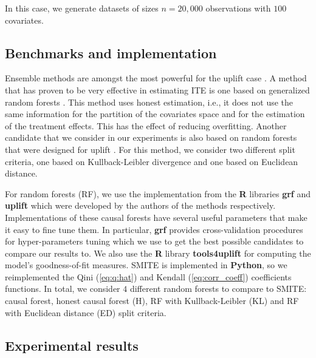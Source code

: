 \documentclass{article}
\begin{document}
In this case, we generate datasets of sizes $n=20,000$ observations with $100$ covariates.



\subsection{Benchmarks and implementation}

Ensemble methods are amongst the most powerful for the uplift case \citep{soltys2015ensemble}. A method that has proven to be very effective in estimating ITE is one based on generalized random forests \citep{athey2019generalized}. This method uses honest estimation, i.e., it does not use the same information for the partition of the covariates space and for the estimation of the treatment effects. This has the effect of reducing overfitting. Another candidate that we consider in our experiments is also based on random forests that were designed for uplift \citep{guelman2012random, jaskowski2012uplift}. For this method, we consider two different split criteria, one based on Kullback-Leibler divergence and one based on Euclidean distance.

For random forests (RF), we use the implementation from the \textbf{R} libraries \textbf{grf} and \textbf{uplift} which were developed by the authors of the methods respectively. Implementations of these causal forests have several useful parameters that make it easy to fine tune them. In particular, \textbf{grf} provides cross-validation procedures for hyper-parameters tuning which we use to get the best possible candidates to compare our results to. We also use the \textbf{R} library \textbf{tools4uplift} for computing the model's goodness-of-fit measures. SMITE is implemented in \textbf{Python}, so we reimplemented the Qini (\ref{eq:q:hat}) and Kendall (\ref{eq:corr_coeff}) coefficients functions. In total, we consider $4$ different random forests to compare to SMITE: causal forest, honest causal forest (H), RF with Kullback-Leibler (KL) and RF with Euclidean distance (ED) split criteria. 

\subsection{Experimental results}
\end{document}
